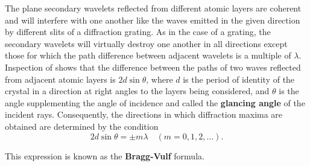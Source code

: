 The plane secondary wavelets reflected from different atomic layers are coherent and will interfere with one another like the waves emitted in the given direction by different slits of a diffraction grating.
As in the case of a grating, the secondary wavelets will virtually destroy one another in all directions except those for which the path difference between adjacent wavelets is a multiple of $\lambda$.
Inspection of  shows that the difference between the paths of two waves reflected from adjacent atomic layers is $2d\sin\theta$, where $d$ is the period of identity of the crystal in a direction at right angles to the layers being considered, and $\theta$ is the angle supplementing the angle of incidence and called the \textbf{glancing angle} of the incident rays.
Consequently, the directions in which diffraction maxima are obtained are determined by the condition
\begin{equation}\label{eq:18_63}
	2d \sin\theta = \pm m \lambda \quad (m=0,1,2,\ldots).
\end{equation}

\noindent
This expression is known as the \textbf{Bragg-Vulf} formula.

